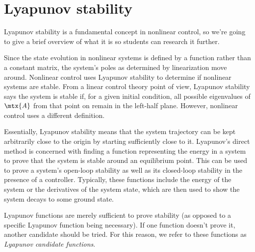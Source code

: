\section{Lyapunov stability}

Lyapunov stability is a fundamental concept in nonlinear control, so we're going
to give a brief overview of what it is so students can research it further.

Since the \gls{state} evolution in nonlinear \glspl{system} is defined by a
function rather than a constant matrix, the \gls{system}'s poles as determined
by \gls{linearization} move around. Nonlinear control uses Lyapunov stability to
determine if nonlinear \glspl{system} are stable. From a linear control theory
point of view, Lyapunov stability says the \gls{system} is stable if, for a
given initial condition, all possible eigenvalues of $\mtx{A}$ from that point
on remain in the left-half plane. However, nonlinear control uses a different
definition.

Essentially, Lyapunov stability means that the \gls{system} trajectory can be
kept arbitrarily close to the origin by starting sufficiently close to it.
Lyapunov's direct method is concerned with finding a function representing the
energy in a \gls{system} to prove that the \gls{system} is stable around an
equilibrium point. This can be used to prove a \gls{system}'s open-loop
stability as well as its closed-loop stability in the presence of a controller.
Typically, these functions include the energy of the \gls{system} or the
derivatives of the \gls{system} \gls{state}, which are then used to show the
\gls{system} decays to some ground state.

Lyapunov functions are merely sufficient to prove stability (as opposed to a
specific Lyapunov function being necessary). If one function doesn't prove it,
another candidate should be tried. For this reason, we refer to these functions
as \textit{Lyapunov candidate functions}.
